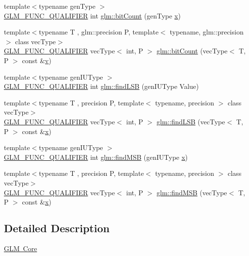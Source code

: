 \begin{DoxyCompactItemize}
\item 
{\footnotesize template$<$typename gen\+Type $>$ }\\\mbox{\hyperlink{setup_8hpp_a33fdea6f91c5f834105f7415e2a64407}{G\+L\+M\+\_\+\+F\+U\+N\+C\+\_\+\+Q\+U\+A\+L\+I\+F\+I\+ER}} int \mbox{\hyperlink{group__core__func__integer_ga44abfe3379e11cbd29425a843420d0d6}{glm\+::bit\+Count}} (gen\+Type \mbox{\hyperlink{glad_8h_a92d0386e5c19fb81ea88c9f99644ab1d}{x}})
\item 
{\footnotesize template$<$typename T , glm\+::precision P, template$<$ typename, glm\+::precision $>$ class vec\+Type$>$ }\\\mbox{\hyperlink{setup_8hpp_a33fdea6f91c5f834105f7415e2a64407}{G\+L\+M\+\_\+\+F\+U\+N\+C\+\_\+\+Q\+U\+A\+L\+I\+F\+I\+ER}} vec\+Type$<$ int, P $>$ \mbox{\hyperlink{group__core__func__integer_ga1f29640969a3c54564da06ac67a5392e}{glm\+::bit\+Count}} (vec\+Type$<$ T, P $>$ const \&\mbox{\hyperlink{glad_8h_a14cfbe2fc2234f5504618905b69d1e06}{v}})
\item 
{\footnotesize template$<$typename gen\+I\+U\+Type $>$ }\\\mbox{\hyperlink{setup_8hpp_a33fdea6f91c5f834105f7415e2a64407}{G\+L\+M\+\_\+\+F\+U\+N\+C\+\_\+\+Q\+U\+A\+L\+I\+F\+I\+ER}} int \mbox{\hyperlink{group__core__func__integer_gaf74c4d969fa34ab8acb9d390f5ca5274}{glm\+::find\+L\+SB}} (gen\+I\+U\+Type Value)
\item 
{\footnotesize template$<$typename T , precision P, template$<$ typename, precision $>$ class vec\+Type$>$ }\\\mbox{\hyperlink{setup_8hpp_a33fdea6f91c5f834105f7415e2a64407}{G\+L\+M\+\_\+\+F\+U\+N\+C\+\_\+\+Q\+U\+A\+L\+I\+F\+I\+ER}} vec\+Type$<$ int, P $>$ \mbox{\hyperlink{group__core__func__integer_ga014a72009e68233c34c06a6dc2251b8c}{glm\+::find\+L\+SB}} (vec\+Type$<$ T, P $>$ const \&\mbox{\hyperlink{glad_8h_a92d0386e5c19fb81ea88c9f99644ab1d}{x}})
\item 
{\footnotesize template$<$typename gen\+I\+U\+Type $>$ }\\\mbox{\hyperlink{setup_8hpp_a33fdea6f91c5f834105f7415e2a64407}{G\+L\+M\+\_\+\+F\+U\+N\+C\+\_\+\+Q\+U\+A\+L\+I\+F\+I\+ER}} int \mbox{\hyperlink{group__core__func__integer_ga7e4a794d766861c70bc961630f8ef621}{glm\+::find\+M\+SB}} (gen\+I\+U\+Type \mbox{\hyperlink{glad_8h_a92d0386e5c19fb81ea88c9f99644ab1d}{x}})
\item 
{\footnotesize template$<$typename T , precision P, template$<$ typename, precision $>$ class vec\+Type$>$ }\\\mbox{\hyperlink{setup_8hpp_a33fdea6f91c5f834105f7415e2a64407}{G\+L\+M\+\_\+\+F\+U\+N\+C\+\_\+\+Q\+U\+A\+L\+I\+F\+I\+ER}} vec\+Type$<$ int, P $>$ \mbox{\hyperlink{group__core__func__integer_ga433104d77ec2ba58888aaefb77e9183f}{glm\+::find\+M\+SB}} (vec\+Type$<$ T, P $>$ const \&\mbox{\hyperlink{glad_8h_a92d0386e5c19fb81ea88c9f99644ab1d}{x}})
\end{DoxyCompactItemize}


\subsection{Detailed Description}
\mbox{\hyperlink{group__core}{G\+LM Core}} 